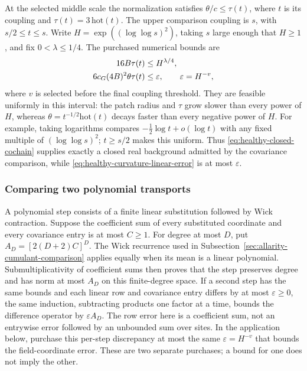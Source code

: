 At the selected middle scale the normalization satisfies
$\theta/c\le\tau(t)$, where $t$ is its coupling and
$\tau(t)=3\,\mathrm{hot}(t)$. The upper comparison coupling is
$s$, with $s/2\le t\le s$. Write $H=\exp((\log\log s)^2)$,
taking $s$ large enough that $H\ge1$, and fix $0<\lambda\le1/4$.
The purchased numerical bounds are
\begin{align}\label{eq:healthy-middle-purchases}
 16B\tau(t)&\le H^{\lambda/4},\\
 6c_G(4B)^2\theta\tau(t)&\le\varepsilon,
                  \qquad \varepsilon=H^{-v},\notag
\end{align}
where $v$ is selected before the final coupling threshold.
They are feasible uniformly in this interval: the patch radius and
$\tau$ grow slower than every power of $H$, whereas
$\theta=t^{-1/2}\mathrm{hot}(t)$ decays faster than every negative
power of $H$. For example, taking logarithms compares
$-\tfrac12\log t+o(\log t)$ with any fixed multiple of
$(\log\log s)^2$; $t\ge s/2$ makes this uniform.
Thus \eqref{eq:healthy-closed-cochain} supplies exactly a closed real
background admitted by the covariance comparison, while
\eqref{eq:healthy-curvature-linear-error} is at most $\varepsilon$.

\subsubsection{Comparing two polynomial transports}

A polynomial step consists of a finite linear substitution followed
by Wick contraction. Suppose the coefficient sum of every substituted
coordinate and every covariance entry is at most $C\ge1$.
For degree at most $D$, put $A_D=[2(D+2)C]^D$.
The Wick recurrence used in
Subsection~\ref{sec:allarity-cumulant-comparison} applies equally when
its mean is a linear polynomial. Submultiplicativity of coefficient
sums then proves that the step preserves degree and has norm at most
$A_D$ on this finite-degree space. If a second step has the same
bounds and each linear row and covariance entry differs by at most
$\varepsilon\ge0$, the same induction, subtracting products one factor
at a time, bounds the difference operator by $\varepsilon A_D$.
The row error here is a coefficient sum, not an entrywise error
followed by an unbounded sum over sites. In the application below,
purchase this per-step discrepancy at most the same
$\varepsilon=H^{-v}$ that bounds the field-coordinate error.
These are two separate purchases; a bound for one does not imply
the other.

